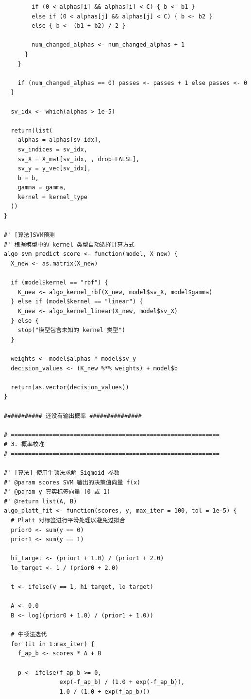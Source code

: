 \documentclass[11pt, a4paper]{article}
\begin{document}
\begin{verbatim}
        if (0 < alphas[i] && alphas[i] < C) { b <- b1 } 
        else if (0 < alphas[j] && alphas[j] < C) { b <- b2 } 
        else { b <- (b1 + b2) / 2 }
        
        num_changed_alphas <- num_changed_alphas + 1
      }
    }
    
    if (num_changed_alphas == 0) passes <- passes + 1 else passes <- 0
  }
  
  sv_idx <- which(alphas > 1e-5)
  
  return(list(
    alphas = alphas[sv_idx],
    sv_indices = sv_idx,
    sv_X = X_mat[sv_idx, , drop=FALSE],
    sv_y = y_vec[sv_idx],
    b = b,
    gamma = gamma,
    kernel = kernel_type
  ))
}

#' [算法]SVM预测
#' 根据模型中的 kernel 类型自动选择计算方式
algo_svm_predict_score <- function(model, X_new) {
  X_new <- as.matrix(X_new)
  
  if (model$kernel == "rbf") {
    K_new <- algo_kernel_rbf(X_new, model$sv_X, model$gamma)
  } else if (model$kernel == "linear") {
    K_new <- algo_kernel_linear(X_new, model$sv_X)
  } else {
    stop("模型包含未知的 kernel 类型")
  }
  
  weights <- model$alphas * model$sv_y
  decision_values <- (K_new %*% weights) + model$b
  
  return(as.vector(decision_values))
}

########### 还没有输出概率 ###############

# ============================================================
# 3. 概率校准
# ============================================================

#' [算法] 使用牛顿法求解 Sigmoid 参数
#' @param scores SVM 输出的决策值向量 f(x)
#' @param y 真实标签向量 (0 或 1)
#' @return list(A, B)
algo_platt_fit <- function(scores, y, max_iter = 100, tol = 1e-5) {
  # Platt 对标签进行平滑处理以避免过拟合
  prior0 <- sum(y == 0)
  prior1 <- sum(y == 1)
  
  hi_target <- (prior1 + 1.0) / (prior1 + 2.0)
  lo_target <- 1 / (prior0 + 2.0)
  
  t <- ifelse(y == 1, hi_target, lo_target)
  
  A <- 0.0
  B <- log((prior0 + 1.0) / (prior1 + 1.0))
  
  # 牛顿法迭代
  for (it in 1:max_iter) {
    f_ap_b <- scores * A + B
    
    p <- ifelse(f_ap_b >= 0, 
                exp(-f_ap_b) / (1.0 + exp(-f_ap_b)), 
                1.0 / (1.0 + exp(f_ap_b)))
    

\end{verbatim}
\end{document}
